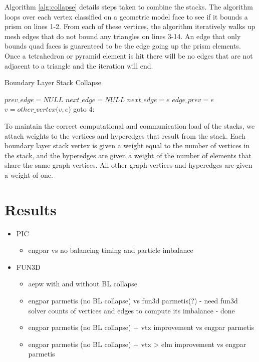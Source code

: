 \documentclass[conference]{IEEEtran}
\begin{document}
Algorithm \ref{alg:collapse} details steps taken to
combine the stacks. The algorithm loops over each vertex classified on a geometric
model face to see if it bounds a prism on lines 1-2. From each of these vertices, the
algorithm iteratively walks up mesh edges that do not bound any triangles on lines 3-14. An edge
that only bounds quad faces is guarenteed to be the edge going up the prism elements. Once
a tetrahedron or pyramid element is hit there will be no edges that are not adjacent to a triangle
and the iteration will end.
\begin{algorithm}
  \caption{Boundary Layer Stack Collapse}
  \label{alg:collapse}
  \small
  \begin{algorithmic}[1]
    \State $prev\_edge = NULL$
    \State $next\_edge = NULL$
    \State $next\_edge = e$
    \EndIf
    \EndFor
    \State $edge\_prev = e$
    \State $v = other\_vertex(v,e$)
    \State goto 4:
    \EndIf
    \EndIf
    \EndFor
  \end{algorithmic}
\end{algorithm}

To maintain the correct computational and communication load of the stacks,
we attach weights to the vertices and hyperedges that result from the stack. Each boundary layer
stack vertex is given a weight equal to the number of vertices in the stack, and the hyperedges
are given a weight of the number of elements that share the same graph vertices. All other
graph vertices and hyperedges are given a weight of one.


\section{Results}
\begin{itemize}
\item PIC
\begin{itemize}
  \item engpar vs no balancing timing and particle imbalance
\end{itemize}
\item FUN3D
\begin{itemize}
  \item aepw with and without BL collapse
  \item engpar parmetis (no BL collapse) vs fun3d parmetis(?) - need fun3d 
    solver counts of vertices and edges to compute its imbalance - done
  \item engpar parmetis (no BL collapse) + vtx improvement vs engpar parmetis
  \item engpar parmetis (no BL collapse) + vtx > elm improvement vs engpar parmetis
\end{itemize}
\end{itemize}
\end{document}
